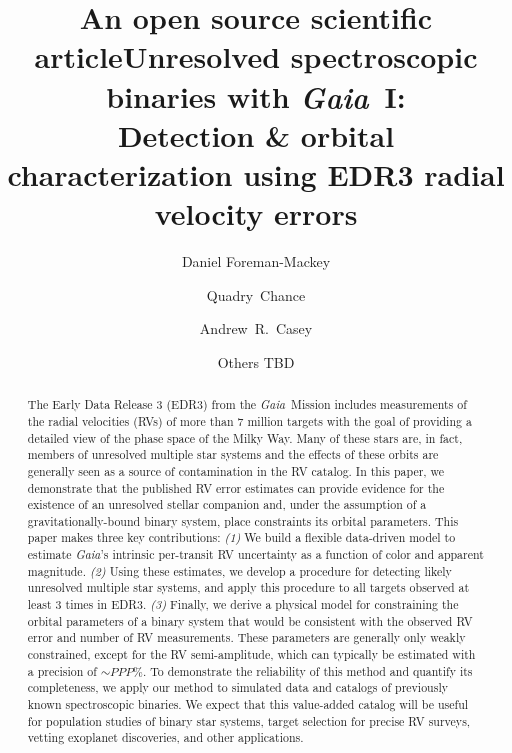 \documentclass[modern, letterpaper]{aastex631}
\newcommand{\project}[1]{\textsl{#1}}
\newcommand{\Gaia}{\project{Gaia}}
\begin{document}
\title{An open source scientific article}

\title{Unresolved spectroscopic binaries with \Gaia\ I: \\
	Detection \& orbital characterization using EDR3 radial velocity errors}


\author[0000-0002-9328-5652]{Daniel Foreman-Mackey}

\author{Quadry~Chance}

\author{Andrew~R.~Casey}

\author{Others TBD}
\noaffiliation{}

\begin{abstract}
	The Early Data Release 3 (EDR3) from the \Gaia\ Mission includes measurements of the radial velocities (RVs) of more than 7 million targets with the goal of providing a detailed view of the phase space of the Milky Way.
	Many of these stars are, in fact, members of unresolved multiple star systems and the effects of these orbits are generally seen as a source of contamination in the RV catalog.
	In this paper, we demonstrate that the published RV error estimates can provide evidence for the existence of an unresolved stellar companion and, under the assumption of a gravitationally-bound binary system, place constraints its orbital parameters.
	This paper makes three key contributions:
	\emph{(1)} We build a flexible data-driven model to estimate \Gaia's intrinsic per-transit RV uncertainty as a function of color and apparent magnitude.
	\emph{(2)} Using these estimates, we develop a procedure for detecting likely unresolved multiple star systems, and apply this procedure to all targets observed at least 3 times in EDR3.
	\emph{(3)} Finally, we derive a physical model for constraining the orbital parameters of a binary system that would be consistent with the observed RV error and number of RV measurements.
	These parameters are generally only weakly constrained, except for the RV semi-amplitude, which can typically be estimated with a precision of $\sim PPP\%$.
	To demonstrate the reliability of this method and quantify its completeness, we apply our method to simulated data and catalogs of previously known spectroscopic binaries.
	We expect that this value-added catalog will be useful for population studies of binary star systems, target selection for precise RV surveys, vetting exoplanet discoveries, and other applications.
\end{abstract}
\end{document}
